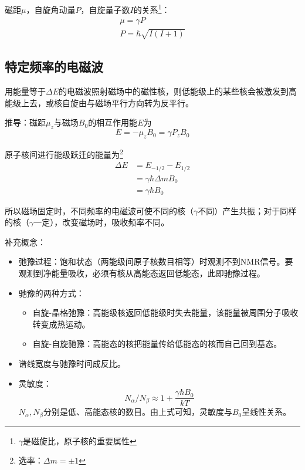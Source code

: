 \begin{note}
	磁距$\mu$，自旋角动量$P$，自旋量子数$I$的关系\footnote{$\gamma$是磁旋比，原子核的重要属性}：
	\begin{gather*}
		\mu=\gamma P\\
		P=\hbar \sqrt{I(I+1)}
	\end{gather*}
\end{note}

\subsection{特定频率的电磁波}
用能量等于$\Delta E$的电磁波照射磁场中的磁性核，则低能级上的某些核会被激发到高能级上去，或核自旋由与磁场平行方向转为反平行。

\begin{note}
推导：磁距$\mu_z$与磁场$B_0$的相互作用能$E$为
\begin{equation*}
	E=-\mu_zB_0=\gamma P_zB_0
\end{equation*}

原子核间进行能级跃迁的能量为\footnote{选率：$\Delta m=\pm 1$}
\begin{align*}
	\Delta E&=E_{-1/2}-E_{1/2}\\
	&=\gamma\hbar\Delta mB_0\\
	&=\gamma\hbar B_0 
\end{align*}

所以磁场固定时，不同频率的电磁波可使不同的核（$\gamma$不同）产生共振；对于同样的核（$\gamma$一定），改变磁场时，吸收频率不同。
\end{note}

\begin{note}
补充概念：
\begin{itemize}
	\item 弛豫过程：饱和状态（两能级间原子核数目相等）时观测不到NMR信号。要观测到净能量吸收，必须有核从高能态返回低能态，此即驰豫过程。
	\item 驰豫的两种方式：
	\begin{itemize}
		\item 自旋-晶格弛豫：高能级核返回低能级时失去能量，该能量被周围分子吸收转变成热运动。		
		\item 自旋-自旋驰豫：高能态的核把能量传给低能态的核而自己回到基态。
	\end{itemize}
	\item 谱线宽度与驰豫时间成反比。
	\item 灵敏度：
	\begin{equation*}
		N_{\alpha}/N_{\beta}\approx 1+\dfrac{\gamma\hbar B_0}{kT}
	\end{equation*}
	$N_{\alpha},N_{\beta}$分别是低、高能态核的数目。由上式可知，灵敏度与$B_0$呈线性关系。
\end{itemize}

\end{note}

